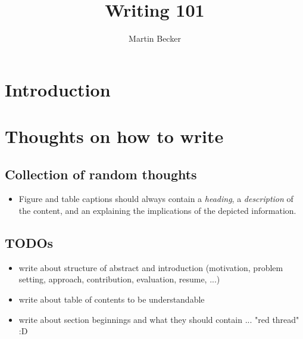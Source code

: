 \documentclass[a4paper]{memoir}
\title{Writing 101}
\author{Martin Becker}
\begin{document}
\tableofcontents

\chapter{Introduction}

\chapter{Thoughts on how to write}
\section{Collection of random thoughts}
\begin{itemize}
	\item Figure and table captions should always contain a \textit{heading}, 
	a \textit{description} of the content, and an 
	explaining the implications of the depicted information.
\end{itemize} 

\section{TODOs}
\begin{itemize}
	\item write about structure of abstract and introduction (motivation, problem setting, approach, contribution, evaluation, resume, ...)
	\item write about table of contents to be understandable
	\item write about section beginnings and what they should contain ... "red thread" :D
\end{itemize}

\listoftodos 

\end{document}
